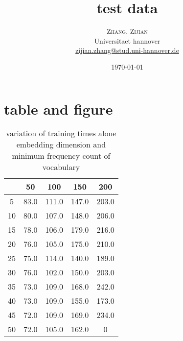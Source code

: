 \documentclass[twoside, twocolumn]{article}
\title{test data}
\author{%
    \textsc{Zhang, Zijian}\\ \hline
    \normalsize Universitaet hannover\\ \hline
    \normalsize \href{mailto:zijian.zhang@stud.uni-hannover.de}{zijian.zhang@stud.uni-hannover.de}\\ \hline
}
\date{\today}
\begin{document}
\maketitle
\section{table and figure}
\begin{table}
\caption{variation of training times alone embedding dimension and minimum frequency count of vocabulary}
\begin{tabular}{ | c | c | c | c | c |}
\hline
& 50& 100& 150& 200 \\ \hline
5& 83.0& 111.0& 147.0& 203.0 \\ \hline
10& 80.0& 107.0& 148.0& 206.0 \\ \hline
15& 78.0& 106.0& 179.0& 216.0 \\ \hline
20& 76.0& 105.0& 175.0& 210.0 \\ \hline
25& 75.0& 114.0& 140.0& 189.0 \\ \hline
30& 76.0& 102.0& 150.0& 203.0 \\ \hline
35& 73.0& 109.0& 168.0& 242.0 \\ \hline
40& 73.0& 109.0& 155.0& 173.0 \\ \hline
45& 72.0& 109.0& 169.0& 234.0 \\ \hline
50& 72.0& 105.0& 162.0& 0 \\ \hline
\end{tabular}
\end{table}
\end{document}
